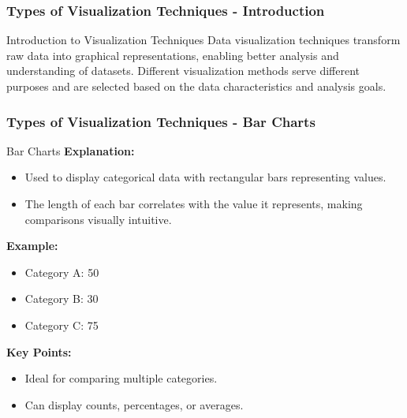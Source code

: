 \documentclass[aspectratio=169]{beamer}
\begin{document}
\begin{frame}[fragile]
  \frametitle{Types of Visualization Techniques - Introduction}
  \begin{block}{Introduction to Visualization Techniques}
    Data visualization techniques transform raw data into graphical representations, enabling better analysis and understanding of datasets. 
    Different visualization methods serve different purposes and are selected based on the data characteristics and analysis goals.
  \end{block}
\end{frame}

\begin{frame}[fragile]
  \frametitle{Types of Visualization Techniques - Bar Charts}
  \begin{block}{Bar Charts}
    \textbf{Explanation:}
    \begin{itemize}
      \item Used to display categorical data with rectangular bars representing values.
      \item The length of each bar correlates with the value it represents, making comparisons visually intuitive.
    \end{itemize}
    
    \textbf{Example:}
    \begin{itemize}
      \item Category A: 50
      \item Category B: 30
      \item Category C: 75
    \end{itemize}
    
    \textbf{Key Points:}
    \begin{itemize}
      \item Ideal for comparing multiple categories.
      \item Can display counts, percentages, or averages.
    \end{itemize}
  \end{block}
\end{frame}
\end{document}
